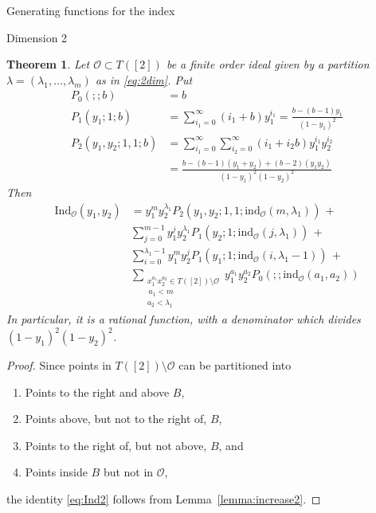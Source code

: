 \documentclass[reqno,a4paper,10pt]{amsart}
\theoremstyle{definition}
\theoremstyle{remark}
\theoremstyle{plain}
\newtheorem{theorem}[definition]{Theorem}
\newcommand{\ind}{\mathrm{ind}}
\newcommand{\Ind}{\mathrm{Ind}}
\begin{document}
\begin{section}{Generating functions for the index}
\begin{subsection}{Dimension 2}
  \begin{theorem}\label{thm:IndDim2}
    Let \(\mathcal{O} \subset T([2])\) be a finite order ideal given by
    a partition 
    \(\lambda=(\lambda_1,\dots,\lambda_m)\) as in \eqref{eq:2dim}.
    Put
    \begin{equation}
      \label{eq:P12}
      \begin{split}
        P_0(;;b) &= b \\
        P_1(y_1;1;b) &= \sum_{i_1=0}^\infty (i_1 +b)y_1^{i_1} =
        \frac{b-(b-1)y_1}{(1-y_1)^2} \\  
        P_2(y_1,y_2;1,1;b) &= \sum_{i_1=0}^\infty
        \sum_{i_2=0}^\infty (i_1 +i_2 b)y_1^{i_1}y_2^{i_2} \\
        &=
        \frac{b-(b-1)(y_1+y_2)+(b-2)(y_1y_2)}{(1-y_1)^2(1-y_2)^2} 
      \end{split}
    \end{equation}
    Then
    \begin{equation}
      \label{eq:Ind2}
      \begin{split}
      \Ind_{\mathcal{O}}(y_1,y_2) 
      & = y_1^my_2^{\lambda_1}
      P_2(y_1,y_2;1,1;\ind_{\mathcal{O}}(m,\lambda_1)) \,+ \\
      & 
      \sum_{j=0}^{m-1}
      y_1^jy_2^{\lambda_1}P_1(y_2;1;\ind_{\mathcal{O}}(j,\lambda_1)) \,+ \\
      & \sum_{i=0}^{\lambda_1-1} y_1^m y_2^j
      P_1(y_1;1;\ind_{\mathcal{O}}(i,\lambda_1-1)) \, +\\
      & \sum_{\substack{x_1^{a_1}x_2^{a_2} \in T([2]) \setminus \mathcal{O}\\
        \, a_1 <m \\ a_2 < \lambda_1}} y_1^{a_1} y_2^{a_2}
      P_0(;;\ind_{\mathcal{O}}(a_1,a_2)) 
      \end{split}
    \end{equation}
    In particular, it is a rational function, with a denominator which
    divides \((1-y_1)^2(1-y_2)^2\).
  \end{theorem}
  \begin{proof}
    Since points in \(T([2]) \setminus \mathcal{O}\) can be partitioned into
    \begin{enumerate}
    \item Points to the right and above \(B\),
    \item Points above, but not to the right of, \(B\),
    \item Points to the right of, but not above, \(B\), and
    \item Points inside \(B\) but not in \(\mathcal{O}\),
    \end{enumerate}
    the identity \eqref{eq:Ind2} follows from
    Lemma~\ref{lemma:increase2}.
  \end{proof}



\end{subsection}
\end{section}
\end{document}
